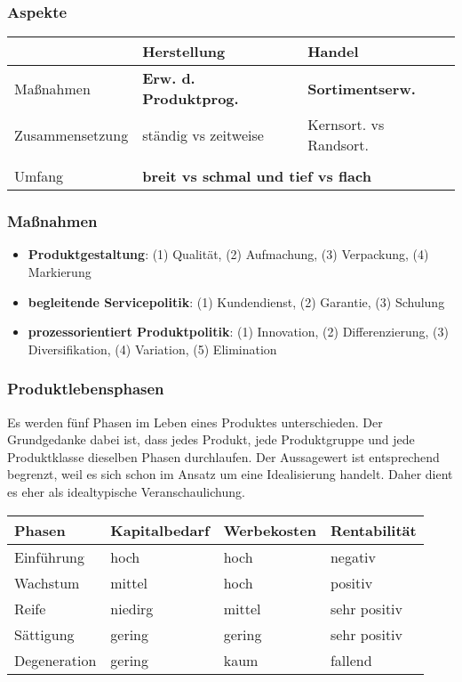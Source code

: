 \subsubsection{Aspekte}

\begin{tabular}{lll}
	& Herstellung & Handel \\
	\hline
	Maßnahmen & {\bf Erw. d. Produktprog.} & {\bf Sortimentserw.} \\
	Zusammensetzung & ständig vs zeitweise & Kernsort. vs Randsort. \\
	{Struktur/\\Umfang} & \multicolumn{2}{l}{{\bf breit vs schmal und tief vs flach}} \\

\end{tabular}

\subsubsection{Maßnahmen}

\begin{itemize}
	\item {\bf Produktgestaltung}: (1) Qualität, (2) Aufmachung, (3) Verpackung, (4) Markierung
	\item {\bf begleitende Servicepolitik}: (1) Kundendienst, (2) Garantie, (3) Schulung
	\item {\bf prozessorientiert Produktpolitik}: (1) Innovation, (2) Differenzierung, (3) Diversifikation, (4) Variation, (5) Elimination
\end{itemize}

\subsubsection{Produktlebensphasen}

Es werden fünf Phasen im Leben eines Produktes unterschieden. Der Grundgedanke dabei ist, dass jedes Produkt, jede Produktgruppe und jede Produktklasse dieselben Phasen durchlaufen. Der Aussagewert ist entsprechend begrenzt, weil es sich schon im Ansatz um eine Idealisierung handelt. Daher dient es eher als idealtypische Veranschaulichung.

\begin{tabular}{llll}
	Phasen & Kapitalbedarf & Werbekosten & Rentabilität \\
	\hline
	Einführung & hoch & hoch & negativ \\
	Wachstum & mittel & hoch & positiv \\
	Reife & niedirg & mittel & sehr positiv \\
	Sättigung & gering & gering & sehr positiv \\
	Degeneration & gering & kaum & fallend \\
\end{tabular}


